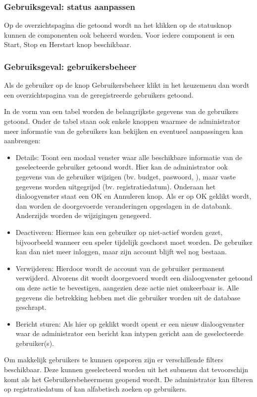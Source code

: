 \subsubsection{Gebruiksgeval: status aanpassen}
Op de overzichtspagina die getoond wordt na het klikken op de statusknop kunnen de componenten ook beheerd worden. Voor iedere component is een Start, Stop en Herstart knop beschikbaar.

\subsubsection{Gebruiksgeval: gebruikersbeheer}
Als de gebruiker op de knop Gebruikersbeheer klikt in het keuzemenu dan wordt een overzichtspagina van de geregistreerde gebruikers getoond.

In de vorm van een tabel worden de belangrijkste gegevens van de gebruikers getoond. Onder de tabel staan ook enkele knoppen waarmee de administrator meer informatie van de gebruikers kan bekijken en eventueel aanpassingen kan aanbrengen:
\begin{itemize}
	\item Details: Toont een modaal venster waar alle beschikbare informatie van de geselecteerde gebruiker getoond wordt. Hier kan de administrator ook gegevens van de gebruiker wijzigen (bv. budget, paswoord, 
), maar vaste gegevens worden uitgegrijsd (bv. registratiedatum). Onderaan het dialoogvenster staat een OK en Annuleren knop. Als er op OK geklikt wordt, dan worden de doorgevoerde veranderingen opgeslagen in de databank. Anderzijds worden de wijzigingen genegeerd.
  \item Deactiveren: Hiermee kan een gebruiker op niet-actief worden gezet, bijvoorbeeld wanneer een speler tijdelijk geschorst moet worden. De gebruiker kan dan niet meer inloggen, maar zijn account blijft wel nog bestaan.
   \item Verwijderen: Hierdoor wordt de account van de gebruiker permanent verwijderd. Alvorens dit wordt doorgevoerd wordt een dialoogvenster getoond om deze actie te bevestigen, aangezien deze actie niet omkeerbaar is. Alle gegevens die betrekking hebben met die gebruiker worden uit de database geschrapt.
    \item Bericht sturen: Als hier op geklikt wordt opent er een nieuw dialoogvenster waar de administrator een bericht kan intypen gericht aan de geselecteerde gebruiker(s).
\end{itemize}
Om makkelijk gebruikers te kunnen opsporen zijn er verschillende filters beschikbaar. Deze kunnen geselecteerd worden uit het submenu dat tevoorschijn komt als het Gebruikersbeheermenu geopend wordt. De administrator kan filteren op registratiedatum of kan alfabetisch zoeken op gebruikers.

